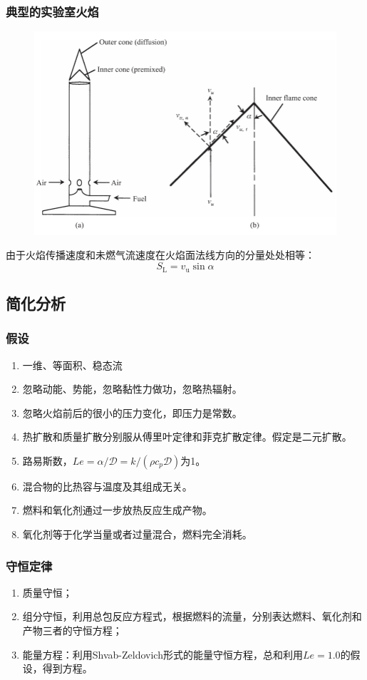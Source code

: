 \subsubsection{典型的实验室火焰}
\begin{figure}[H]
    \centering
    \includegraphics[width=.32\textwidth]{img/bunsen.png}
\end{figure}
由于火焰传播速度和未燃气流速度在火焰面法线方向的分量处处相等：
\begin{equation}
    S_\mathrm{L} = v_\mathrm{u}\sin \alpha
\end{equation}

\subsection{简化分析}
\subsubsection{假设}
\begin{enumerate}
    \item 一维、等面积、稳态流
    \item 忽略动能、势能，忽略黏性力做功，忽略热辐射。
    \item 忽略火焰前后的很小的压力变化，即压力是常数。
    \item 热扩散和质量扩散分别服从傅里叶定律和菲克扩散定律。假定是二元扩散。
    \item  路易斯数，\(Le = \alpha/\mathcal{D} = k/(\rho c_p \mathcal{D})\)为1。
    \item 混合物的比热容与温度及其组成无关。
    \item 燃料和氧化剂通过一步放热反应生成产物。
    \item 氧化剂等于化学当量或者过量混合，燃料完全消耗。
\end{enumerate}

\subsubsection{守恒定律}
\begin{enumerate}
    \item 质量守恒；
    \item 组分守恒，利用总包反应方程式，根据燃料的流量，分别表达燃料、氧化剂和产物三者的守恒方程；
    \item 能量方程：利用Shvab-Zeldovich形式的能量守恒方程，总和利用\(Le=1.0\)的假设，得到方程。
\end{enumerate}

